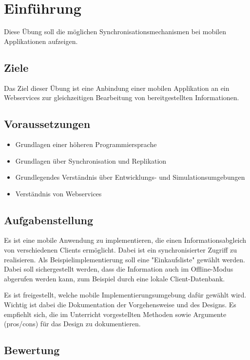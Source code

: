 
\section{Einführung}
Diese Übung soll die möglichen Synchronisationsmechanismen bei mobilen Applikationen aufzeigen.

\subsection{Ziele}
Das Ziel dieser Übung ist eine Anbindung einer mobilen Applikation an ein Webservices zur gleichzeitigen Bearbeitung von bereitgestellten Informationen.

\subsection{Voraussetzungen}
\begin{itemize}
	\item Grundlagen einer höheren Programmiersprache
	\item Grundlagen über Synchronisation und Replikation
	\item Grundlegendes Verständnis über Entwicklungs- und Simulationsumgebungen
	\item Verständnis von Webservices
\end{itemize}

\subsection{Aufgabenstellung}
Es ist eine mobile Anwendung zu implementieren, die einen Informationsabgleich von verschiedenen Clients ermöglicht. Dabei ist ein synchronisierter Zugriff zu realisieren. Als Beispielimplementierung soll eine "Einkaufsliste" gewählt werden. Dabei soll sichergestellt werden, dass die Information auch im Offline-Modus abgerufen werden kann, zum Beispiel durch eine lokale Client-Datenbank.

Es ist freigestellt, welche mobile Implementierungsumgebung dafür gewählt wird. Wichtig ist dabei die Dokumentation der Vorgehensweise und des Designs. Es empfiehlt sich, die im Unterricht vorgestellten Methoden sowie Argumente (pros/cons) für das Design zu dokumentieren.

\subsection{Bewertung}

